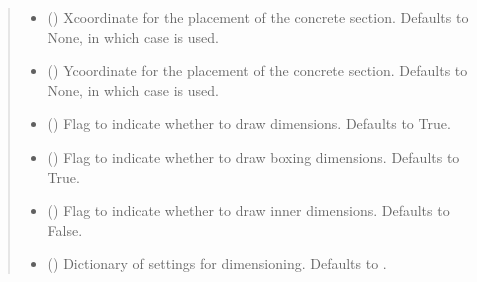 \documentclass[a4paper,10pt,english]{sphinxmanual}
\begin{document}
\begin{fulllineitems}
\begin{fulllineitems}
\begin{quote}
\begin{description}
\begin{itemize}
\item {} 
\sphinxAtStartPar
{} (\sphinxstyleliteralemphasis{\sphinxupquote{, }}) \textendash{} X\sphinxhyphen{}coordinate for the placement of the concrete section. Defaults to None, in which case  is
used.

\item {} 
\sphinxAtStartPar
{} (\sphinxstyleliteralemphasis{\sphinxupquote{, }}) \textendash{} Y\sphinxhyphen{}coordinate for the placement of the concrete section. Defaults to None, in which case  is
used.

\item {} 
\sphinxAtStartPar
{} (\sphinxstyleliteralemphasis{\sphinxupquote{, }}) \textendash{} Flag to indicate whether to draw dimensions. Defaults to True.

\item {} 
\sphinxAtStartPar
{} (\sphinxstyleliteralemphasis{\sphinxupquote{, }}) \textendash{} Flag to indicate whether to draw boxing dimensions. Defaults to True.

\item {} 
\sphinxAtStartPar
{} (\sphinxstyleliteralemphasis{\sphinxupquote{, }}) \textendash{} Flag to indicate whether to draw inner dimensions. Defaults to False.

\item {} 
\sphinxAtStartPar
{} (\sphinxstyleliteralemphasis{\sphinxupquote{, }}) \textendash{} Dictionary of settings for dimensioning. Defaults to .

\end{itemize}


\end{description}
\end{quote}
\end{fulllineitems}
\end{fulllineitems}
\end{document}
